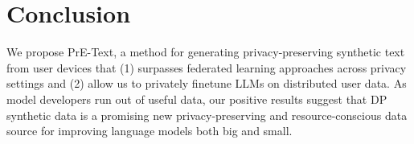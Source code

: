 \section{Conclusion}
We propose PrE-Text, a method for generating privacy-preserving synthetic text from user devices that (1) surpasses federated learning approaches across privacy settings and (2) allow us to privately finetune LLMs on distributed user data. As model developers run out of useful data, our positive results suggest that DP synthetic data is a promising new privacy-preserving and resource-conscious data source for improving language models both big and small. 
